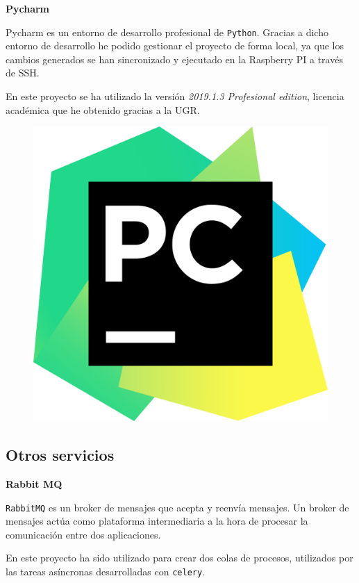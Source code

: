 \textbf{Pycharm}

Pycharm \cite{ref22} es un entorno de desarrollo profesional de \texttt{Python}. Gracias a dicho entorno de desarrollo he podido gestionar el proyecto de forma local, ya que los cambios generados se han sincronizado y ejecutado en la Raspberry PI a través de SSH.

En este proyecto se ha utilizado la versión \textit{2019.1.3 Profesional edition}, licencia académica que he obtenido gracias a la UGR. 

\begin{figure}[h]
	\centering
	\includegraphics[scale=0.06]{images/18}
\end{figure}


\subsection{Otros servicios}

\textbf{Rabbit MQ} 

\texttt{RabbitMQ} \cite{ref23} es un broker de mensajes que acepta y reenvía mensajes. Un broker de mensajes actúa como plataforma intermediaria a la hora de procesar la comunicación entre dos aplicaciones.

En este proyecto ha sido utilizado para crear dos colas de procesos, utilizados por las tareas asíncronas desarrolladas con \texttt{celery}.

